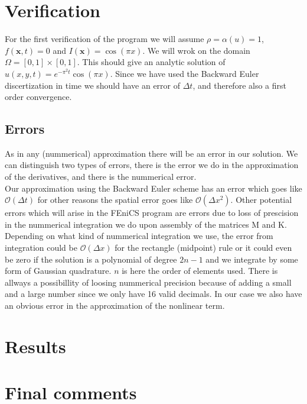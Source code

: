 \documentclass[a4paper,english, 10pt, twoside]{article}
\begin{document}
\section*{Verification}
For the first verification of the program we will assume $\rho = \alpha(u) = 1$, $f(\mathbf{x},t) = 0$ and $I(\mathbf{x}) = \cos(\pi x)$. We 
will wrok on the domain $\Omega = [0,1]\times[0,1]$. This should give an analytic solution of $u(x,y,t) = e^{-\pi^2t}\cos(\pi x)$. Since we have used 
the Backward Euler discertization in time we should have an error of $\Delta t$, and therefore also a first order convergence. \\


\subsection*{Errors}
As in any (nummerical) approximation there will be an error in our solution. We can distinguish two types of errors, there is the error we do in 
the approximation of the derivatives, and there is the nummerical error.\\
Our approximation using the Backward Euler scheme has an error which goes like $\mathcal{O}(\Delta t)$ for other reasons the spatial error goes 
like $\mathcal{O}(\Delta x^2)$. Other potential errors which will arise in the FEniCS program are errors due to loss of prescision in the 
nummerical integration we do upon assembly of the matrices M and K. Depending on what kind of nummerical integration we use, the error from integration 
could be $\mathcal{O}(\Delta x)$ for the rectangle (midpoint) rule or it could even be zero if the solution is a polynomial of degree $2n-1$ 
and we integrate by some form of Gaussian quadrature. $n$ is here the order of elements used.
There is allways a possibillity of loosing nummerical precision because of adding a small and a large number since we only have 16 valid decimals.
In our case we also have an obvious error in the approximation of the nonlinear term. 

\section*{Results}

\section*{Final comments}
\end{document}
